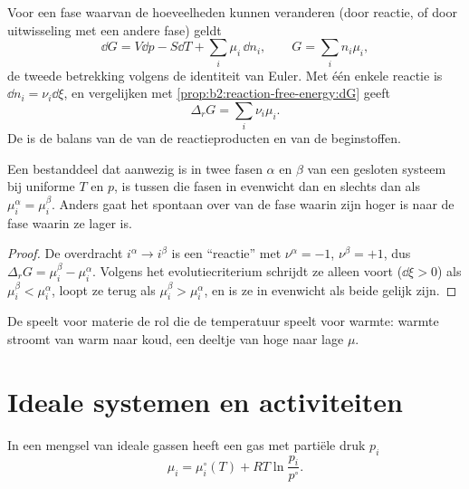 Voor een fase waarvan de hoeveelheden kunnen veranderen (door reactie, of door uitwisseling met
een andere fase) geldt
\[
  \dd G = V\dd p - S\dd T + \sum_i\mu_i\,\dd n_i ,\qquad G = \sum_i n_i\mu_i ,
\]
de tweede betrekking volgens de identiteit van Euler. Met één enkele reactie is $\dd n_i =
\nu_i\dd\xi$, en vergelijken met \cref{prop:b2:reaction-free-energy:dG} geeft
\[
  \Delta_r G = \sum_i\nu_i\mu_i .
\]
De  is de balans van de  van de
reactieproducten en van de beginstoffen.

\begin{theorem}\label{thm:b2:chemical-potential:phase-equilibrium}
Een bestanddeel dat aanwezig is in twee fasen $\alpha$ en $\beta$ van een gesloten systeem bij
uniforme $T$ en $p$, is tussen die fasen in evenwicht dan en slechts dan als
$\mu_i^\alpha = \mu_i^\beta$. Anders gaat het spontaan over van de
fase waarin zijn  hoger is naar de fase waarin ze lager is.
\end{theorem}

\begin{proof}
De overdracht $i^\alpha \to i^\beta$ is een ``reactie'' met $\nu^\alpha = -1$,
$\nu^\beta = +1$, dus $\Delta_r G = \mu_i^\beta - \mu_i^\alpha$. Volgens het
evolutiecriterium schrijdt ze alleen voort ($\dd\xi > 0$) als $\mu_i^\beta <
\mu_i^\alpha$, loopt ze terug als $\mu_i^\beta > \mu_i^\alpha$, en is ze in
evenwicht als beide gelijk zijn.
\end{proof}

De  speelt voor materie de rol die de temperatuur speelt
voor warmte: warmte stroomt van warm naar koud, een deeltje van hoge naar lage $\mu$.

\section{Ideale systemen en activiteiten}

\begin{proposition}\label{prop:b2:chemical-potential:mu-gas}
In een mengsel van ideale gassen heeft een gas met partiële druk $p_i$
\[
  \mu_i = \mu_i^\circ(T) + RT\ln\frac{p_i}{p^\circ} .
\]
\end{proposition}

